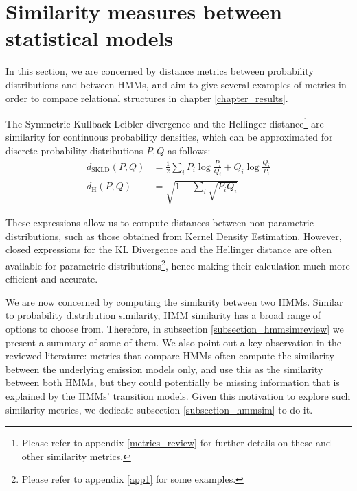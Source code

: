 \documentclass[../main.tex]{subfiles}
\begin{document}
\section{Similarity measures between statistical models} \label{section_similarity}
In this section, we are concerned by distance metrics between probability distributions and between HMMs, and aim to give several examples of metrics in order to compare relational structures in chapter \ref{chapter_results}. 
\par The Symmetric Kullback-Leibler divergence and the Hellinger distance\footnote{Please refer to appendix \ref{metrics_review} for further details on these and other similarity metrics.} are similarity for continuous probability densities, which can be approximated for discrete probability distributions $P, Q$ as follows:
\begin{align*}
d_{\text{SKLD}}(P, Q) &= \frac{1}{2}\sum_iP_i\log{\frac{P_i}{Q_i}} + Q_i\log{\frac{Q_i}{P_i}}\\
d_{\text{H}}(P, Q) &= \sqrt{1 - \sum_i \sqrt{P_iQ_i}}
\end{align*}
\par These expressions allow us to compute distances between non-parametric distributions, such as those obtained from Kernel Density Estimation. However, closed expressions for the KL Divergence and the Hellinger distance are often available for parametric distributions\footnote{Please refer to appendix \ref{app1} for some examples.}, hence making their calculation much more efficient and accurate.
\par We are now concerned by computing the similarity between two HMMs. Similar to probability distribution similarity, HMM similarity has a broad range of options to choose from. Therefore, in subsection \ref{subsection_hmmsimreview} we present a summary of some of them. We also point out a key observation in the reviewed literature: metrics that compare HMMs often compute the similarity between the underlying emission models only, and use this as the similarity between both HMMs, but they could potentially be missing information that is explained by the HMMs' transition models. Given this motivation to explore such similarity metrics, we dedicate subsection \ref{subsection_hmmsim} to do it.
\end{document}
